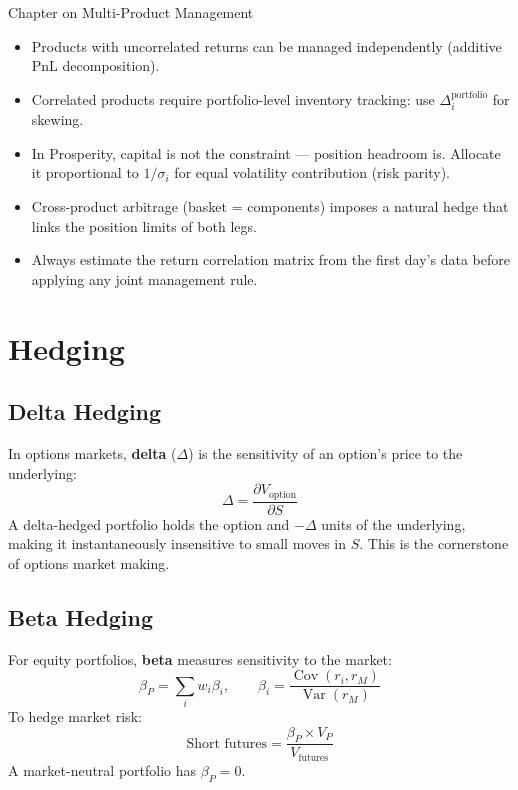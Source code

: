 \documentclass[12pt,a4paper,openany]{report}
\theoremstyle{definition}
\newcommand{\Var}{\operatorname{Var}}
\newcommand{\Cov}{\operatorname{Cov}}
\begin{document}
\begin{takeawaybox}{Chapter on Multi-Product Management}
\begin{itemize}
  \item Products with uncorrelated returns can be managed independently (additive PnL decomposition).
  \item Correlated products require portfolio-level inventory tracking: use $\Delta_i^{\text{portfolio}}$ for skewing.
  \item In Prosperity, capital is not the constraint — position headroom is. Allocate it proportional to $1/\sigma_i$ for equal volatility contribution (risk parity).
  \item Cross-product arbitrage (basket = components) imposes a natural hedge that links the position limits of both legs.
  \item Always estimate the return correlation matrix from the first day's data before applying any joint management rule.
\end{itemize}
\end{takeawaybox}


\chapter{Hedging}

\section{Delta Hedging}

In options markets, \textbf{delta} ($\Delta$) is the sensitivity of an option's price to the underlying:
\[
  \Delta = \frac{\partial V_{\text{option}}}{\partial S}
\]
A delta-hedged portfolio holds the option and $-\Delta$ units of the underlying, making it instantaneously insensitive to small moves in $S$. This is the cornerstone of options market making.

\section{Beta Hedging}

For equity portfolios, \textbf{beta} measures sensitivity to the market:
\[
  \beta_P = \sum_i w_i \beta_i, \qquad \beta_i = \frac{\Cov(r_i, r_M)}{\Var(r_M)}
\]
To hedge market risk:
\[
  \text{Short futures} = \frac{\beta_P \times V_P}{V_{\text{futures}}}
\]
A market-neutral portfolio has $\beta_P = 0$.
\end{document}
